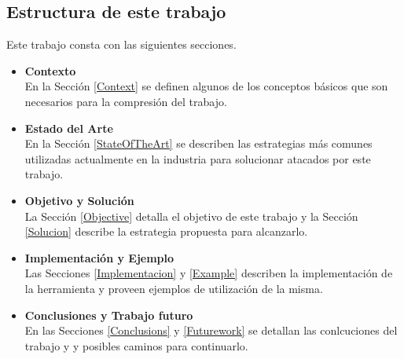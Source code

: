 \bigskip

\subsection{Estructura de este trabajo}

Este trabajo consta con las siguientes secciones.

\begin{itemize}
	\item {\bf Contexto}\\
		En la Sección \ref{Context} se definen algunos de los conceptos básicos que son necesarios para la compresión del trabajo.
	\item {\bf Estado del Arte}\\	
		En la Sección \ref{StateOfTheArt} se describen las estrategias más comunes utilizadas actualmente en la industria para solucionar 		atacados por este trabajo.
	\item{\bf Objetivo y Solución}\\
		La Sección \ref{Objective} detalla el objetivo de este trabajo y la Sección \ref{Solucion} describe la estrategia propuesta para 		alcanzarlo.
	\item{\bf Implementación y Ejemplo}\\
		Las Secciones \ref{Implementacion} y \ref{Example} describen la implementación de la herramienta y proveen ejemplos de utilización 		de la misma.
	\item{\bf Conclusiones y Trabajo futuro}\\		
		En las Secciones \ref{Conclusions} y \ref{Futurework} se detallan las conlcuciones del trabajo y y posibles caminos para 
		continuarlo.  
\end{itemize}

